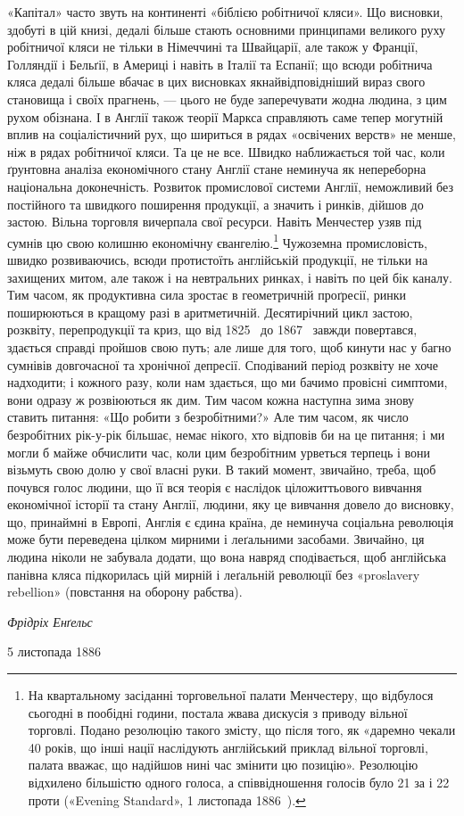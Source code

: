 «Капітал» часто звуть на континенті «біблією робітничої
кляси». Що висновки, здобуті в цій книзі, дедалі більше стають
основними принципами великого руху робітничої кляси не тільки
в Німеччині та Швайцарії, але також у Франції, Голляндії і
Бельґії, в Америці і навіть в Італії та Еспанії; що всюди робітнича
кляса дедалі більше вбачає в цих висновках якнайвідповідніший
вираз свого становища і своїх прагнень, — цього не буде
заперечувати жодна людина, з цим рухом обізнана. І в Англії також
теорії Маркса справляють саме тепер могутній вплив на соціалістичний
рух, що шириться в рядах «освічених верств» не менше,
ніж в рядах робітничої кляси. Та це не все. Швидко наближається
той час, коли ґрунтовна аналіза економічного стану Англії стане
неминуча як непереборна національна доконечність. Розвиток
промислової системи Англії, неможливий без постійного та швидкого
поширення продукції, а значить і ринків, дійшов до застою.
Вільна торговля вичерпала свої ресурси. Навіть Менчестер узяв
під сумнів цю свою колишню економічну євангелію.\footnote{
На квартальному засіданні торговельної палати Менчестеру, що
відбулося сьогодні в пообідні години, постала жвава дискусія з приводу
вільної торговлі. Подано резолюцію такого змісту, що після того, як
«даремно чекали 40 років, що інші нації наслідують англійський приклад
вільної торговлі, палата вважає, що надійшов нині час змінити цю позицію».
Резолюцію відхилено більшістю одного голоса, а співвідношення
голосів було 21 за і 22 проти («Evening Standard», 1 листопада 1886~).
} Чужоземна
промисловість, швидко розвиваючись, всюди протистоїть англійській
продукції, не тільки на захищених митом, але також і на
невтральних ринках, і навіть по цей бік каналу. Тим часом, як
продуктивна сила зростає в геометричній проґресії, ринки поширюються
в кращому разі в аритметичній. Десятирічний цикл
застою, розквіту, перепродукції та криз, що від 1825~ до 1867~
завжди повертався, здається справді пройшов свою путь; але
лише для того, щоб кинути нас у багно сумнівів довгочасної та
хронічної депресії. Сподіваний період розквіту не хоче надходити;
і кожного разу, коли нам здається, що ми бачимо провісні
симптоми, вони одразу ж розвіюються як дим. Тим часом  кожна
наступна зима знову ставить питання: «Що робити з безробітними?»
Але тим часом, як число безробітних рік-у-рік більшає,
немає нікого, хто відповів би на це питання; і ми могли б майже
обчислити час, коли цим безробітним урветься терпець і вони
візьмуть свою долю у свої власні руки. В такий момент, звичайно,
треба, щоб почувся голос людини, що її вся теорія є наслідок
ціложиттьового вивчання економічної історії та стану Англії,
людини, яку це вивчання довело до висновку, що, принаймні в
Европі, Англія є єдина країна, де неминуча соціальна революція
може бути переведена цілком мирними і леґальними засобами.
Звичайно, ця людина ніколи не забувала додати, що вона навряд
сподівається, щоб англійська панівна кляса підкорилась цій
мирній і леґальній революції без «proslavery rebellion» (повстання
на оборону рабства).

\begin{flushright}
\emph{Фрідріх Енґельс}
\end{flushright}

{\small 5 листопада 1886~}
